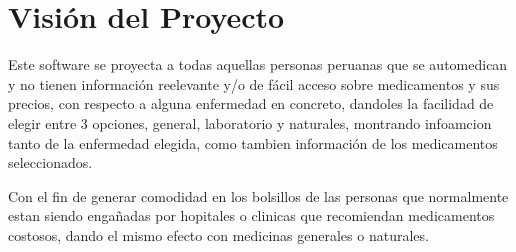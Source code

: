\chapter{Visión del Proyecto}

Este software se proyecta a todas aquellas personas peruanas que se automedican y no tienen información reelevante y/o de fácil acceso sobre medicamentos y sus precios, con respecto a alguna enfermedad en concreto, dandoles la facilidad de elegir entre 3 opciones, general,  laboratorio y naturales, montrando infoamcion tanto de la enfermedad elegida, como tambien información de los medicamentos seleccionados.  \vspace{0.30cm}

Con el fin de generar comodidad en los bolsillos de las personas que normalmente estan siendo engañadas por hopitales o clinicas que recomiendan medicamentos costosos, dando el mismo efecto con medicinas generales o naturales.

   